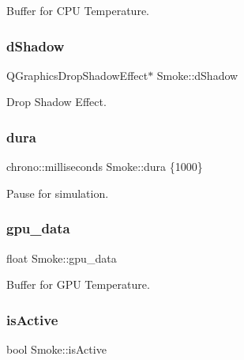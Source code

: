 Buffer for C\+PU Temperature. 

\mbox{\label{classSmoke_a26f011df30f860db285ef97713ca7989}} 
\subsubsection{\texorpdfstring{dShadow}{dShadow}}
{\footnotesize\ttfamily Q\+Graphics\+Drop\+Shadow\+Effect$\ast$ Smoke\+::d\+Shadow\hspace{0.3cm}{\ttfamily [private]}}



Drop Shadow Effect. 

\mbox{\label{classSmoke_ae62660aa3919c7a01b5a0c3ad5ec1715}} 
\subsubsection{\texorpdfstring{dura}{dura}}
{\footnotesize\ttfamily chrono\+::milliseconds Smoke\+::dura \{1000\}\hspace{0.3cm}{\ttfamily [private]}}



Pause for simulation. 

\mbox{\label{classSmoke_afcd49fb97c3573ec4c779346d4be1c95}} 
\subsubsection{\texorpdfstring{gpu\_data}{gpu\_data}}
{\footnotesize\ttfamily float Smoke\+::gpu\+\_\+data\hspace{0.3cm}{\ttfamily [private]}}



Buffer for G\+PU Temperature. 

\mbox{\label{classSmoke_a83c338b4ec7a3d71443e8f1fd9d7a1b5}} 
\subsubsection{\texorpdfstring{isActive}{isActive}}
{\footnotesize\ttfamily bool Smoke\+::is\+Active\hspace{0.3cm}{\ttfamily [private]}}



